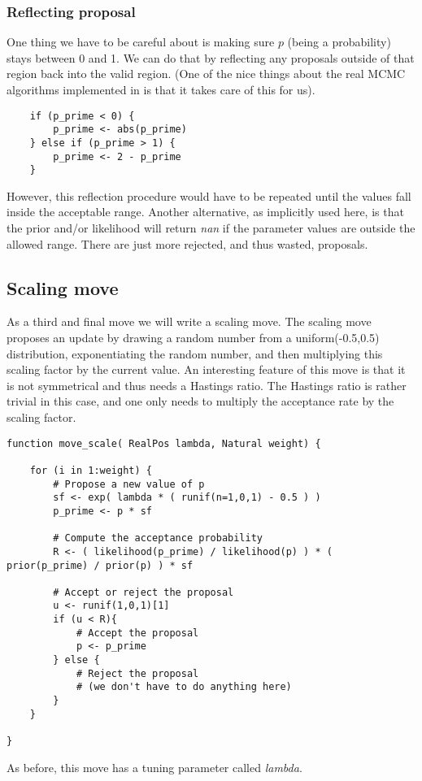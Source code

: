 \subsubsection{Reflecting proposal}
One thing we have to be careful about is making sure $p$ (being a probability) stays between 0 and 1.
We can do that by reflecting any proposals outside of that region back into the valid region.
(One of the nice things about the real MCMC algorithms implemented in \RevBayes is that it takes care of this for us).
{\tt \begin{snugshade*}
\begin{lstlisting}    
	if (p_prime < 0) {
		p_prime <- abs(p_prime)
	} else if (p_prime > 1) {
		p_prime <- 2 - p_prime
	}
\end{lstlisting}
\end{snugshade*}}
However, this reflection procedure would have to be repeated until the values fall inside the acceptable range.
Another alternative, as implicitly used here, is that the prior and/or likelihood will return \emph{nan} if the parameter values are outside the allowed range.
There are just more rejected, and thus wasted, proposals.


\subsection{Scaling move}
As a third and final move we will write a scaling move.
The scaling move proposes an update by drawing a random number from a uniform(-0.5,0.5) distribution, exponentiating the random number, and then multiplying this scaling factor by the current value.
An interesting feature of this move is that it is not symmetrical and thus needs a Hastings ratio.
The Hastings ratio is rather trivial in this case, and one only needs to multiply the acceptance rate by the scaling factor.
{\tt \begin{snugshade*}
\begin{lstlisting}    
function move_scale( RealPos lambda, Natural weight) {

    for (i in 1:weight) {
        # Propose a new value of p
        sf <- exp( lambda * ( runif(n=1,0,1) - 0.5 ) )
        p_prime <- p * sf

        # Compute the acceptance probability
        R <- ( likelihood(p_prime) / likelihood(p) ) * ( prior(p_prime) / prior(p) ) * sf
    
        # Accept or reject the proposal
        u <- runif(1,0,1)[1]
        if (u < R){
            # Accept the proposal
            p <- p_prime
        } else {
            # Reject the proposal
            # (we don't have to do anything here)
        }
    }
    
}
\end{lstlisting}
\end{snugshade*}}
As before, this move has a tuning parameter called \emph{lambda}.

